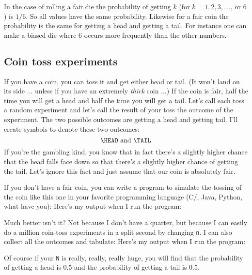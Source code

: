 In the case of rolling a fair die 
the probability of getting $k$ (for $k = 1, 2, 3$, ..., or $6$) is
$1/6$.
So all values have the same probability.
Likewise for a fair coin the probability is the same
for getting a head and getting a tail.
For instance one can make a biased die where 6 occurs more frequently
than the other numbers.








\subsection{Coin toss experiments}

If you have a coin, you can toss it and get either head or tail.
(It won't land on its side ... unless if you have
an extremely \textit{ thick} coin ...)
If the coin is fair, half the time you will get a head and 
half the time you will get a tail.
Let's call each toss a random experiment and let's
call the result of your toss the outcome of the experiment.
The two possible outcomes are getting a head and getting tail.
I'll create symbols to denote these two outcomes:
\[
  \HEAD \text{ and } \TAIL
\]
If you're the gambling kind, you know that in fact there's a slightly
higher chance that the head falls face down so that 
there's a slightly higher chance of getting the tail.
Let's ignore this fact and just assume that our coin is absolutely fair.

If you don't have a fair coin, you can write a 
program to simulate the tossing of the coin like this one
in your favorite programming language (C/\cpp, Java, Python, what-have-you):
{\footnotesize
{}
}
Here's my output when I run the program:


Much better isn't it?
Not because I don't have a quarter, but because I can easily
do a million coin-toss experiments in a split second by changing \verb!n!.
I can also collect all the outcomes and tabulate:
{\small
{}
}
Here's my output when I run the program:




Of course if your \verb!N! is really, really, really huge,
you will find that the probability of getting a head is 0.5 and 
the probability of getting a tail is 0.5.

